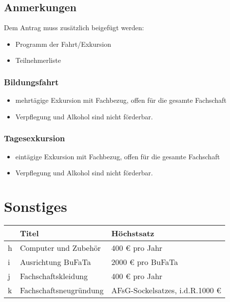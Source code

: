 \documentclass{article}
\begin{document}
    \subsection{Anmerkungen}
    Dem Antrag muss zusätzlich beigefügt werden:
        \begin{itemize}
            \item Programm der Fahrt/Exkursion
            \item Teilnehmerliste
        \end{itemize}
        \subsubsection{Bildungsfahrt}
            \begin{itemize}
                \item  mehrtägige Exkursion mit Fachbezug, offen für die gesamte Fachschaft
                \item Verpflegung und Alkohol sind nicht förderbar.
            \end{itemize}
        
        \subsubsection{Tagesexkursion}
            \begin{itemize}
                \item eintägige Exkursion mit Fachbezug, offen für die gesamte Fachschaft
                \item Verpflegung und Alkohol sind nicht förderbar.
            \end{itemize}
            

    
\section{Sonstiges}
    \setlength\extrarowheight{2mm} \sffamily
    \begin{tabular}{l||L{6cm}|L{7cm}}
        &\textbf{Titel} & \textbf{Höchstsatz}\\[1mm] \hline \hline
        h&
        Computer und Zubehör &
        400 € pro Jahr \\[1mm] \hline
         

         
        i&
        Ausrichtung BuFaTa  &
        2000 € pro BuFaTa \\[1mm] \hline
        
        j&
        Fachschaftskleidung&
        400 € pro Jahr \\[1mm] \hline
         
        k&
        Fachschaftsneugründung &
        AFsG-Sockelsatzes, i.d.R.1000 € \\[1mm]
    \end{tabular}
    \rmfamily
\end{document}

